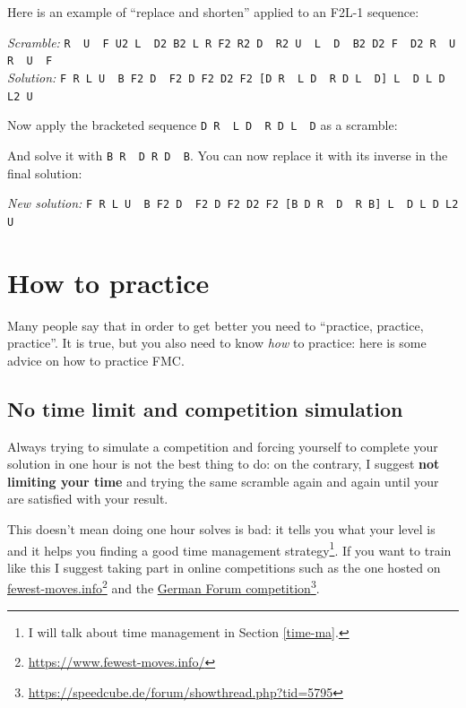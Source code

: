 \documentclass[11pt,a4paper]{book}
\newcommand{\p}{\textquotesingle}
\newcommand{\m}{\texttt}
\newcommand{\ps}{\p\,\,}
\begin{document}
Here is an example of ``replace and shorten'' applied to an F2L-1 sequence:
\begin{center}
\emph{Scramble:} \m{R\ps U\ps F U2 L\ps D2 B2 L R F2 R2 D\ps R2 U\ps L\ps D\ps B2 D2 F\ps D2 R\ps U R\ps U\ps F}\\
\emph{Solution:} \m{F R L U\ps B F2 D\ps F2 D F2 D2 F2 [D R\ps L D\ps R D L\ps D\p] L\ps D L D L2 U}
\end{center}
Now apply the bracketed sequence \m{D R\ps L D\ps R D L\ps D\p} as a scramble:
\begin{center}

\end{center}
And solve it with \m{B R\ps D R D\ps B\p}. You can now replace it with its inverse in the final solution:
\begin{center}
\emph{New solution:} \m{F R L U\ps B F2 D\ps F2 D F2 D2 F2 [B D R\ps D\ps R B\p] L\ps D L D L2 U}
\end{center}





\chapter{How to practice}

Many people say that in order to get better you need to ``practice, practice, practice''. It is true, but you also need to know \emph{how} to practice: here is some advice on how to practice FMC.

\section{No time limit and competition simulation}

Always trying to simulate a competition and forcing yourself to complete your solution in one hour is not the best thing to do: on the contrary, I suggest \textbf{not limiting your time} and trying the same scramble again and again until your are satisfied with your result.

This doesn't mean doing one hour solves is bad: it tells you what your level is and it helps you finding a good time management strategy\footnote{I will talk about time management in Section \ref{time-ma}.}. If you want to train like this I suggest taking part in online competitions such as the one hosted on \href{https://www.fewest-moves.info/}{fewest-moves.info}\footnote{\url{https://www.fewest-moves.info/}} and the \href{https://speedcube.de/forum/showthread.php?tid=5795}{German Forum competition}\footnote{\url{https://speedcube.de/forum/showthread.php?tid=5795}}.
\end{document}
